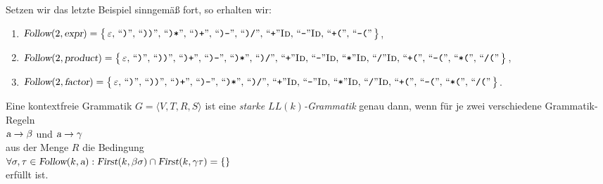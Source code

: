 \example
Setzen wir das letzte Beispiel sinngem\"a{\ss} fort, so erhalten wir:
\begin{enumerate}
\item $\textsl{Follow}(2, \textsl{expr}) = 
      \bigl\{\, \varepsilon,\, 
      \mbox{``\texttt{)}''},\, 
      \mbox{``\texttt{))}''},\,
      \mbox{``\texttt{)*}''},\,
      \mbox{``\texttt{)+}''},\,
      \mbox{``\texttt{)-}''},\, 
      \mbox{``\texttt{)/}''},\, 
      \mbox{``\texttt{+}''}\textsc{Id},\,
      \mbox{``\texttt{-}''}\textsc{Id},\,
      \mbox{``\texttt{+(}''},\,
      \mbox{``\texttt{-(}''}\,
      \bigr\}$,
\item $\textsl{Follow}(2, \textsl{product}) =       
      \bigl\{\, \varepsilon,\, 
      \mbox{``\texttt{)}''},\, 
      \mbox{``\texttt{))}''},\,
      \mbox{``\texttt{)+}''},\,
      \mbox{``\texttt{)-}''},\,
      \mbox{``\texttt{)*}''},\, 
      \mbox{``\texttt{)/}''},\, 
      \mbox{``\texttt{+}''}\textsc{Id},\,
      \mbox{``\texttt{-}''}\textsc{Id},\,
      \mbox{``\texttt{*}''}\textsc{Id},\,
      \mbox{``\texttt{/}''}\textsc{Id},\,
      \mbox{``\texttt{+(}''},\,
      \mbox{``\texttt{-(}''},\,
      \mbox{``\texttt{*(}''},\,
      \mbox{``\texttt{/(}''}\,
      \bigr\}$,
\item $\textsl{Follow}(2, \textsl{factor}) = \bigl\{\, 
      \varepsilon,\, 
      \mbox{``\texttt{)}''},\, 
      \mbox{``\texttt{))}''},\,
      \mbox{``\texttt{)+}''},\,
      \mbox{``\texttt{)-}''},\,
      \mbox{``\texttt{)*}''},\, 
      \mbox{``\texttt{)/}''},\, 
      \mbox{``\texttt{+}''}\textsc{Id},\,
      \mbox{``\texttt{-}''}\textsc{Id},\,
      \mbox{``\texttt{*}''}\textsc{Id},\,
      \mbox{``\texttt{/}''}\textsc{Id},\,
      \mbox{``\texttt{+(}''},\,
      \mbox{``\texttt{-(}''},\,
      \mbox{``\texttt{*(}''},\,
      \mbox{``\texttt{/(}''}\,
      \bigr\}$.
\end{enumerate}

\begin{Definition}
  Eine kontextfreie Grammatik $G = \langle V, T, R, S \rangle$ ist eine 
  \emph{starke $LL(k)$-Grammatik} genau dann, wenn f\"ur je zwei verschiedene Grammatik-Regeln
  \\[0.2cm]
  \hspace*{1.3cm}
  $\textsl{a} \rightarrow \beta$ \quad und \quad $\textsl{a} \rightarrow \gamma$
  \\[0.2cm]
  aus der Menge $R$ die Bedingung 
  \\[0.2cm]
  \hspace*{1.3cm}
  $\forall \sigma, \tau \in \textsl{Follow}(k, \textsl{a}): 
   \textsl{First}(k, \beta \sigma) \cap \textsl{First}(k, \gamma \tau) = \{\}$
  \\[0.2cm]
  erf\"ullt ist. \eox
\end{Definition}

